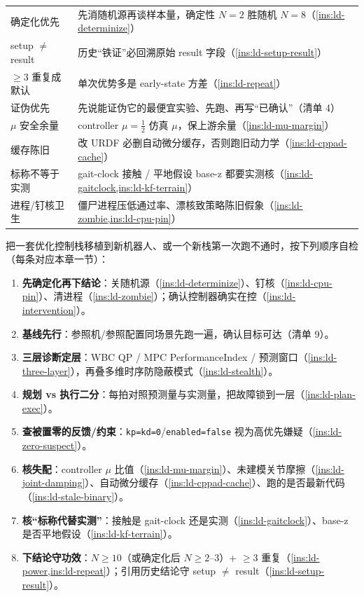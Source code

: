 \begin{table}[H]
\begin{tabular}{p{} p{}}
确定化优先 & 先消随机源再谈样本量，确定性 $N{=}2$ 胜随机 $N{=}8$（\cref{ins:ld-determinize}）\\
setup $\ne$ result & 历史“铁证”必回溯原始 result 字段（\cref{ins:ld-setup-result}）\\
$\ge 3$ 重复成默认 & 单次优势多是 early-state 方差（\cref{ins:ld-repeat}）\\
证伪优先 & 先说能证伪它的最便宜实验、先跑、再写“已确认”（清单 4）\\
$\mu$ 安全余量 & controller $\mu=\tfrac12$ 仿真 $\mu$，保上游余量（\cref{ins:ld-mu-margin}）\\
缓存陈旧 & 改 URDF 必删自动微分缓存，否则跑旧动力学（\cref{ins:ld-cppad-cache}）\\
标称不等于实测 & gait-clock 接触 / 平地假设 base-z 都要实测核（\cref{ins:ld-gaitclock,ins:ld-kf-terrain}）\\
进程/钉核卫生 & 僵尸进程压低通过率、漂核致策略陈旧假象（\cref{ins:ld-zombie,ins:ld-cpu-pin}）\\
\bottomrule
\end{tabular}
\label{tab:ld-cheatsheet}
\end{table}

\begin{practice}
把一套优化控制栈移植到新机器人、或一个新栈第一次跑不通时，按下列顺序自检（每条对应本章一节）：
\begin{enumerate}
  \item \textbf{先确定化再下结论}：关随机源（\cref{ins:ld-determinize}）、钉核（\cref{ins:ld-cpu-pin}）、清进程（\cref{ins:ld-zombie}）；确认控制器确实在控（\cref{ins:ld-intervention}）。
  \item \textbf{基线先行}：参照机/参照配置同场景先跑一遍，确认目标可达（清单 9）。
  \item \textbf{三层诊断定层}：WBC QP / MPC PerformanceIndex / 预测窗口（\cref{ins:ld-three-layer}），再叠多维时序防隐蔽模式（\cref{ins:ld-stealth}）。
  \item \textbf{规划 vs 执行二分}：每拍对照预测量与实测量，把故障锁到一层（\cref{ins:ld-plan-exec}）。
  \item \textbf{查被置零的反馈/约束}：\texttt{kp=kd=0}/\allowbreak\texttt{enabled=false} 视为高优先嫌疑（\cref{ins:ld-zero-suspect}）。
  \item \textbf{核失配}：controller $\mu$ 比值（\cref{ins:ld-mu-margin}）、未建模关节摩擦（\cref{ins:ld-joint-damping}）、自动微分缓存（\cref{ins:ld-cppad-cache}）、跑的是否最新代码（\cref{ins:ld-stale-binary}）。
  \item \textbf{核“标称代替实测”}：接触是 gait-clock 还是实测（\cref{ins:ld-gaitclock}）、base-z 是否平地假设（\cref{ins:ld-kf-terrain}）。
  \item \textbf{下结论守功效}：$N\ge 10$（或确定化后 $N\ge 2$--$3$）+ $\ge 3$ 重复（\cref{ins:ld-power,ins:ld-repeat}）；引用历史结论守 setup $\ne$ result（\cref{ins:ld-setup-result}）。
\end{enumerate}
\end{practice}

